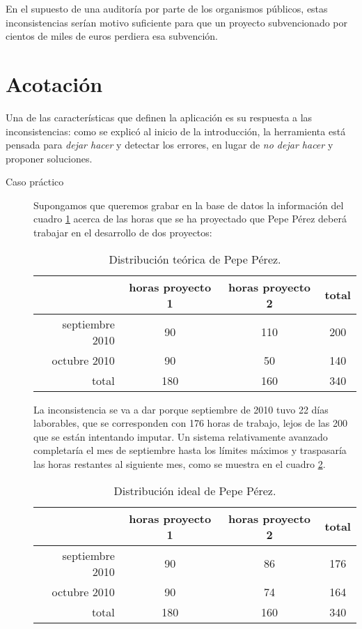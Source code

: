 En el supuesto de una auditoría por parte de los organismos públicos, estas
inconsistencias serían motivo suficiente para que un proyecto subvencionado por
cientos de miles de euros perdiera esa subvención.


\section{Acotación}
\label{sec:acotacion}

Una de las características que definen la aplicación es su respuesta a las
inconsistencias: como se explicó al inicio de la introducción, la herramienta
está pensada para \textit{dejar hacer} y detectar los errores, en lugar de
\textit{no dejar hacer} y proponer soluciones.

\begin{description}
 \item[Caso práctico] Supongamos que queremos grabar en la base de datos la
información del cuadro \ref{tab:distribucion_teorica} acerca de las horas que se
ha proyectado que Pepe Pérez
deberá trabajar en el desarrollo de dos proyectos:

\begin{table}
\centering
\begin{tabular}{|r|c|c||c|}\hline
 & horas proyecto 1  & horas proyecto 2 & total\\\hline\hline
septiembre 2010 & 90 & 110 & 200 \\\hline
octubre 2010 & 90 & 50 & 140\\\hline\hline
total & 180 & 160 & 340\\\hline
\end{tabular}
\caption{Distribución teórica de Pepe Pérez.}
\label{tab:distribucion_teorica}
\end{table}

La inconsistencia se va a dar porque septiembre de 2010 tuvo 22 días laborables,
que se corresponden con 176 horas de trabajo, lejos de las 200 que se están
intentando imputar. Un sistema relativamente avanzado completaría el mes de
septiembre hasta los límites máximos y traspasaría las horas restantes al
siguiente mes, como se muestra en el cuadro \ref{tab:distribucion_ideal}.

\begin{table}
\centering
\begin{tabular}{|r|c|c||c|}\hline
 & horas proyecto 1  & horas proyecto 2 & total \\\hline\hline
septiembre 2010 & 90 & 86 & 176 \\\hline
octubre 2010 & 90 & 74 & 164\\\hline\hline
total & 180 & 160 & 340\\\hline
\end{tabular}
\caption{Distribución ideal de Pepe Pérez.}
\label{tab:distribucion_ideal}
\end{table}


\end{description}
